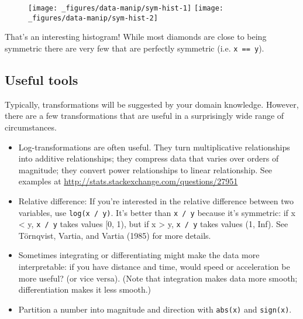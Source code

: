 \begin{Shaded}
\begin{Highlighting}[]
\NormalTok{(}\StringTok{ }
\StringTok{  }\NormalTok{(} \NormalTok{)}

\StringTok{ }\StringTok{ }\NormalTok{)}
\NormalTok{(}\StringTok{ }
\StringTok{  }\NormalTok{(} \NormalTok{)}
\end{Highlighting}
\end{Shaded}

\begin{figure}[H]
  \texttt{[image: \_figures/data-manip/sym-hist-1]}%
  \texttt{[image: \_figures/data-manip/sym-hist-2]}
\end{figure}

That's an interesting histogram! While most diamonds are close to being
symmetric there are very few that are perfectly symmetric (i.e.
\texttt{x\ ==\ y}).

\subsection{Useful tools}

Typically, transformations will be suggested by your domain knowledge.
However, there are a few transformations that are useful in a
surprisingly wide range of circumstances.

\begin{itemize}
\item
  Log-transformations are often useful. They turn multiplicative
  relationships into additive relationships; they compress data that
  varies over orders of magnitude; they convert power relationships to
  linear relationship. See examples at
  \url{http://stats.stackexchange.com/questions/27951}
\item
  Relative difference: If you're interested in the relative difference
  between two variables, use \texttt{log(x\ /\ y)}. It's better than
  \texttt{x\ /\ y} because it's symmetric: if x \textless{} y,
  \texttt{x\ /\ y} takes values {[}0, 1), but if x \textgreater{} y,
  \texttt{x\ /\ y} takes values (1, Inf). See Törnqvist, Vartia, and
  Vartia (1985) for more details. 
\item
  Sometimes integrating or differentiating might make the data more
  interpretable: if you have distance and time, would speed or
  acceleration be more useful? (or vice versa). (Note that integration
  makes data more smooth; differentiation makes it less smooth.)
\item
  Partition a number into magnitude and direction with \texttt{abs(x)}
  and \texttt{sign(x)}.
\end{itemize}

